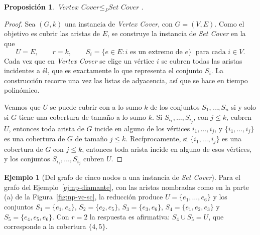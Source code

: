 \documentclass[12pt, spanish, oneside, openany]{book}
\newcommand{\redp}{\le_{P}}
\newcommand{\prob}[1]{\textit{#1}}
\newcommand{\VC}{\prob{Vertex Cover}\xspace}
\newcommand{\SC}{\prob{Set Cover}\xspace}
\theoremstyle{uprightplain}
\newtheorem{proposicion}[teorema]{Proposición}
\theoremstyle{definition}
\newtheorem{ejemplo}[teorema]{Ejemplo}
\theoremstyle{remark}
\theoremstyle{definition}
\begin{document}
\begin{proposicion}
\label{prop:np-vc-sc}
$\VC\redp\SC$.
\end{proposicion}
\begin{proof}
Sea $(G,k)$ una instancia de \VC, con $G=(V,E)$. Como el objetivo es cubrir las aristas de $E$, se construye la instancia de \SC en la que
\[
U=E,\qquad r=k,\qquad S_i=\{e\in E : i\text{ es un extremo de }e\}\ \text{ para cada } i\in V.
\]
Cada vez que en \VC se elige un vértice $i$ se cubren todas las aristas incidentes a él, que es exactamente lo que representa el conjunto $S_i$. La construcción recorre una vez las listas de adyacencia, así que se hace en tiempo polinómico.

Veamos que $U$ se puede cubrir con a lo sumo $k$ de los conjuntos $S_1,\dots,S_n$ si y solo si $G$ tiene una cobertura de tamaño a lo sumo $k$. Si $S_{i_1},\dots,S_{i_j}$, con $j\le k$, cubren $U$, entonces toda arista de $G$ incide en alguno de los vértices $i_1,\dots,i_j$, y $\{i_1,\dots,i_j\}$ es una cobertura de $G$ de tamaño $j\le k$. Recíprocamente, si $\{i_1,\dots,i_j\}$ es una cobertura de $G$ con $j\le k$, entonces toda arista incide en alguno de esos vértices, y los conjuntos $S_{i_1},\dots,S_{i_j}$ cubren $U$.
\end{proof}

\begin{ejemplo}[Del grafo de cinco nodos a una instancia de \SC]
\label{ej:np-vc-sc}
Para el grafo del Ejemplo~\ref{ej:np-diamante}, con las aristas nombradas como en la parte (a) de la Figura~\ref{fig:np-vc-sc}, la reducción produce $U=\{e_1,\dots,e_6\}$ y los conjuntos $S_1=\{e_1,e_4\}$, $S_2=\{e_2,e_5\}$, $S_3=\{e_3,e_6\}$, $S_4=\{e_1,e_2,e_3\}$ y $S_5=\{e_4,e_5,e_6\}$. Con $r=2$ la respuesta es afirmativa: $S_4\cup S_5=U$, que corresponde a la cobertura $\{4,5\}$.
\end{ejemplo}
\end{document}
